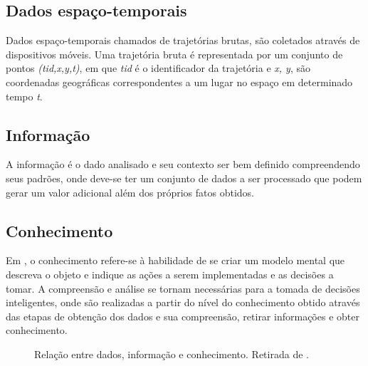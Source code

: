 \documentclass[	12pt, Times, openright, twoside, a4paper, english, brazil]{abntex2}
\begin{document}
\subsection{Dados espaço-temporais}
Dados espaço-temporais chamados de trajetórias brutas, são coletados através de dispositivos móveis. Uma trajetória bruta é representada por um conjunto de pontos \textit{(tid,x,y,t)}, em que \textit{tid} é o identificador da trajetória e \textit{x, y}, são coordenadas geográficas correspondentes a um lugar no espaço em determinado tempo \textit{t}.

\subsection{Informação}
A informação é o dado analisado e seu contexto ser bem definido compreendendo seus padrões, onde deve-se ter um conjunto de dados a ser processado que podem gerar um valor adicional além dos próprios fatos obtidos.

\subsection{Conhecimento}
Em \cite{Rezende2003}, o conhecimento refere-se à habilidade de se criar um modelo mental que descreva o objeto e indique as ações a serem implementadas e as decisões a tomar. A compreensão e análise se tornam necessárias para a tomada de decisões inteligentes, onde são realizadas a partir do nível do conhecimento obtido através das etapas de obtenção dos dados e sua compreensão, retirar informações e obter conhecimento.\\

\begin{figure}[htb]
\caption{Relação entre dados, informação e conhecimento. Retirada de \cite{Rezende2003}.\label{fig:relação}}
\end{figure}
\end{document}
